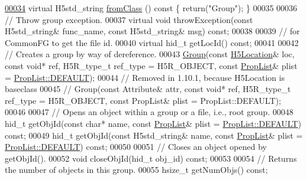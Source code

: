 \begin{DoxyCode}
\hyperlink{class_h5_1_1_group_abb4ed8f72b879befe5bd125b64c07c8a}{00034}         \textcolor{keyword}{virtual} H5std\_string \hyperlink{class_h5_1_1_group_abb4ed8f72b879befe5bd125b64c07c8a}{fromClass} ()\textcolor{keyword}{ const }\{ \textcolor{keywordflow}{return}(\textcolor{stringliteral}{"Group"}); \}
00035 
00036         \textcolor{comment}{// Throw group exception.}
00037         \textcolor{keyword}{virtual} \textcolor{keywordtype}{void} throwException(\textcolor{keyword}{const} H5std\_string& func\_name, \textcolor{keyword}{const} H5std\_string& msg) \textcolor{keyword}{const};
00038 
00039         \textcolor{comment}{// for CommonFG to get the file id.}
00040         \textcolor{keyword}{virtual} hid\_t getLocId() \textcolor{keyword}{const};
00041 
00042         \textcolor{comment}{// Creates a group by way of dereference.}
00043         \hyperlink{class_h5_1_1_group}{Group}(\textcolor{keyword}{const} \hyperlink{class_h5_1_1_h5_location}{H5Location}& loc, \textcolor{keyword}{const} \textcolor{keywordtype}{void}* ref, H5R\_type\_t ref\_type = H5R\_OBJECT, \textcolor{keyword}{
      const} \hyperlink{class_h5_1_1_prop_list}{PropList}& plist = \hyperlink{class_h5_1_1_prop_list_ae52af66ce82af0ea7e6dc57148c56241}{PropList::DEFAULT});
00044         \textcolor{comment}{// Removed in 1.10.1, because H5Location is baseclass}
00045 \textcolor{comment}{//        Group(const Attribute& attr, const void* ref, H5R\_type\_t ref\_type = H5R\_OBJECT, const PropList&
       plist = PropList::DEFAULT);}
00046 
00047         \textcolor{comment}{// Opens an object within a group or a file, i.e., root group.}
00048         hid\_t getObjId(\textcolor{keyword}{const} \textcolor{keywordtype}{char}* name, \textcolor{keyword}{const} \hyperlink{class_h5_1_1_prop_list}{PropList}& plist = 
      \hyperlink{class_h5_1_1_prop_list_ae52af66ce82af0ea7e6dc57148c56241}{PropList::DEFAULT}) \textcolor{keyword}{const};
00049         hid\_t getObjId(\textcolor{keyword}{const} H5std\_string& name, \textcolor{keyword}{const} \hyperlink{class_h5_1_1_prop_list}{PropList}& plist = 
      \hyperlink{class_h5_1_1_prop_list_ae52af66ce82af0ea7e6dc57148c56241}{PropList::DEFAULT}) \textcolor{keyword}{const};
00050 
00051         \textcolor{comment}{// Closes an object opened by getObjId().}
00052         \textcolor{keywordtype}{void} closeObjId(hid\_t obj\_id) \textcolor{keyword}{const};
00053 
00054         \textcolor{comment}{// Returns the number of objects in this group.}
00055         hsize\_t getNumObjs() \textcolor{keyword}{const};

\end{DoxyCode}
